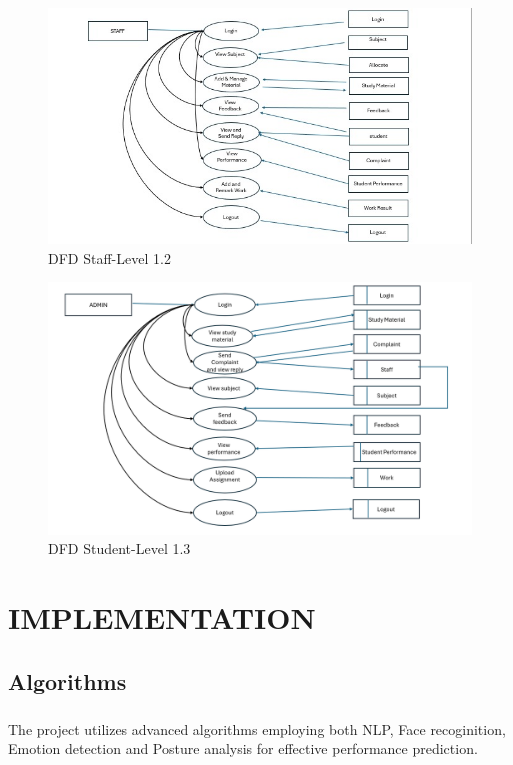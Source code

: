 \begin{figure}[!ht]
\centering
\includegraphics[width=125mm]{WhatsApp Image 2024-04-26 at 1.31.39 AM (1).jpeg}
\caption{DFD Staff-Level 1.2}
\end{figure} 

\begin{figure}[!ht]
\centering
\includegraphics[width=125mm]{student dfd.png}
\caption{DFD Student-Level 1.3}
\end{figure} 



\chapter[IMPLEMENTATION]{\fontsize{16}{12}\vspace{-.59in}\selectfont IMPLEMENTATION}
\section{Algorithms}
\paragraph{}The project utilizes advanced algorithms employing both NLP, Face recoginition, Emotion detection and Posture analysis for effective performance prediction.

